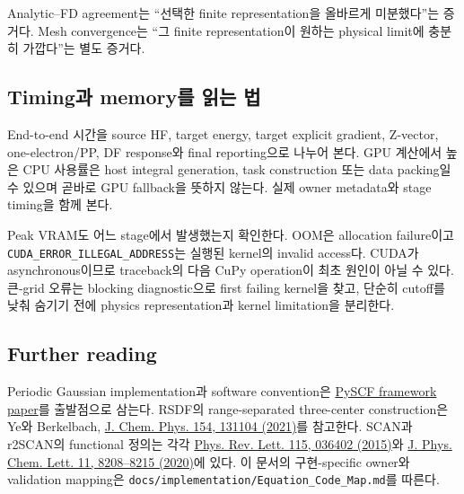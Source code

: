 Analytic--FD agreement는 ``선택한 finite representation을 올바르게 미분했다''는
증거다. Mesh convergence는 ``그 finite representation이 원하는 physical limit에
충분히 가깝다''는 별도 증거다.

\subsection{Timing과 memory를 읽는 법}

End-to-end 시간을 source HF, target energy, target explicit gradient, Z-vector,
one-electron/PP, DF response와 final reporting으로 나누어 본다. GPU 계산에서 높은 CPU
사용률은 host integral generation, task construction 또는 data packing일 수 있으며 곧바로
GPU fallback을 뜻하지 않는다. 실제 owner metadata와 stage timing을 함께 본다.

Peak VRAM도 어느 stage에서 발생했는지 확인한다. OOM은 allocation failure이고
\texttt{CUDA\_ERROR\_ILLEGAL\_ADDRESS}는 실행된 kernel의 invalid access다. CUDA가
asynchronous이므로 traceback의 다음 CuPy operation이 최초 원인이 아닐 수 있다. 큰-grid
오류는 blocking diagnostic으로 first failing kernel을 찾고, 단순히 cutoff를 낮춰 숨기기
전에 physics representation과 kernel limitation을 분리한다.

\subsection{Further reading}

Periodic Gaussian implementation과 software convention은
\href{https://doi.org/10.1002/wcms.1340}{PySCF framework paper}를 출발점으로 삼는다.
RSDF의 range-separated three-center construction은 Ye와 Berkelbach,
\href{https://doi.org/10.1063/5.0046617}{J. Chem. Phys. 154, 131104 (2021)}를
참고한다. SCAN과 r2SCAN의 functional 정의는 각각
\href{https://doi.org/10.1103/PhysRevLett.115.036402}{Phys. Rev. Lett. 115,
036402 (2015)}와
\href{https://doi.org/10.1021/acs.jpclett.0c02405}{J. Phys. Chem. Lett. 11,
8208--8215 (2020)}에 있다. 이 문서의 구현-specific owner와 validation mapping은
\texttt{docs/implementation/Equation\_Code\_Map.md}를 따른다.
